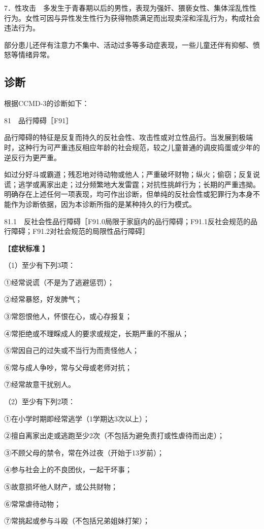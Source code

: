 7．性攻击　多发生于青春期以后的男性，表现为强奸、猥亵女性、集体淫乱性性行为。女性可因与异性发生性行为获得物质满足而出现卖淫和淫乱行为，构成社会违法行为。

部分患儿还伴有注意力不集中、活动过多等多动症表现，一些儿童还伴有抑郁、愤怒等情绪异常。

\subsection{诊断}

根据CCMD-3的诊断如下：

81　品行障碍［F91］

品行障碍的特征是反复而持久的反社会性、攻击性或对立性品行。当发展到极端时，这种行为可严重违反相应年龄的社会规范，较之儿童普通的调皮捣蛋或少年的逆反行为更严重。

如过分好斗或霸道；残忍地对待动物或他人；严重破坏财物；纵火；偷窃；反复说谎；逃学或离家出走；过分频繁地大发雷霆；对抗性挑衅行为；长期的严重违拗。明确存在上述任何一项表现，均可作出诊断，但单纯的反社会性或犯罪行为本身不能作为诊断依据，因为本诊断所指的是某种持久的行为模式。

81.1　反社会性品行障碍［F91.0局限于家庭内的品行障碍；F91.1反社会规范的品行障碍；F91.2对社会规范的局限性品行障碍］

【\textbf{症状标准} 】

（1）至少有下列3项：

①经常说谎（不是为了逃避惩罚）；

②经常暴怒，好发脾气；

③常怨恨他人，怀恨在心，或心存报复；

④常拒绝或不理睬成人的要求或规定，长期严重的不服从；

⑤常因自己的过失或不当行为而责怪他人；

⑥常与成人争吵，常与父母或老师对抗；

⑦经常故意干扰别人。

（2）至少有下列2项：

①在小学时期即经常逃学（1学期达3次以上）；

②擅自离家出走或逃跑至少2次（不包括为避免责打或性虐待而出走）；

③不顾父母的禁令，常在外过夜（开始于13岁前）；

④参与社会上的不良团伙，一起干坏事；

⑤故意损坏他人财产，或公共财物；

⑥常常虐待动物；

⑦常挑起或参与斗殴（不包括兄弟姐妹打架）；

